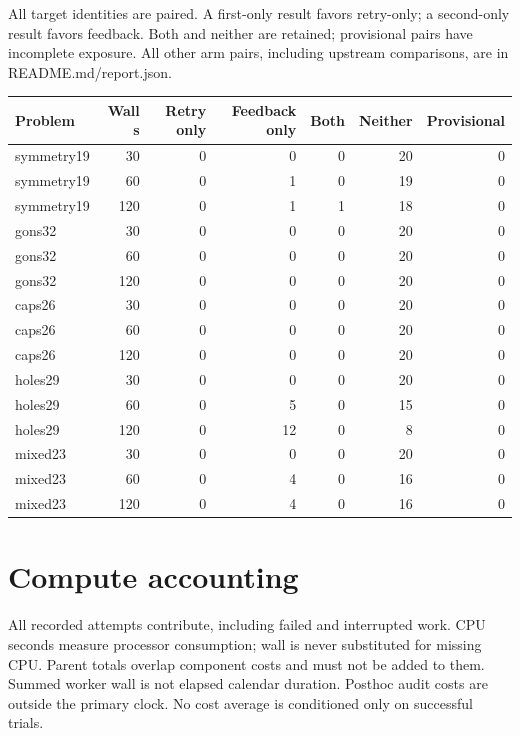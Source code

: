 \documentclass[10pt,a4paper]{article}
\begin{document}
All target identities are paired. A first-only result favors retry-only; a second-only result favors feedback. Both and neither are retained; provisional pairs have incomplete exposure. All other arm pairs, including upstream comparisons, are in README.md/report.json.

\begin{center}\small\begin{longtable}{lrrrrrr}
\toprule
Problem & Wall s & Retry only & Feedback only & Both & Neither & Provisional \\
\midrule\endhead
symmetry19 & 30 & 0 & 0 & 0 & 20 & 0 \\
symmetry19 & 60 & 0 & 1 & 0 & 19 & 0 \\
symmetry19 & 120 & 0 & 1 & 1 & 18 & 0 \\
gons32 & 30 & 0 & 0 & 0 & 20 & 0 \\
gons32 & 60 & 0 & 0 & 0 & 20 & 0 \\
gons32 & 120 & 0 & 0 & 0 & 20 & 0 \\
caps26 & 30 & 0 & 0 & 0 & 20 & 0 \\
caps26 & 60 & 0 & 0 & 0 & 20 & 0 \\
caps26 & 120 & 0 & 0 & 0 & 20 & 0 \\
holes29 & 30 & 0 & 0 & 0 & 20 & 0 \\
holes29 & 60 & 0 & 5 & 0 & 15 & 0 \\
holes29 & 120 & 0 & 12 & 0 & 8 & 0 \\
mixed23 & 30 & 0 & 0 & 0 & 20 & 0 \\
mixed23 & 60 & 0 & 4 & 0 & 16 & 0 \\
mixed23 & 120 & 0 & 4 & 0 & 16 & 0 \\
\bottomrule\end{longtable}\end{center}


\section*{Compute accounting}

All recorded attempts contribute, including failed and interrupted work. CPU seconds measure processor consumption; wall is never substituted for missing CPU. Parent totals overlap component costs and must not be added to them. Summed worker wall is not elapsed calendar duration. Posthoc audit costs are outside the primary clock. No cost average is conditioned only on successful trials.
\end{document}
